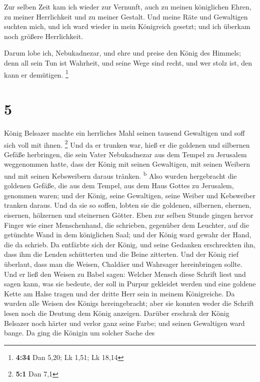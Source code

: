  Zur selben Zeit kam ich wieder zur Vernunft, auch zu
meinen königlichen Ehren, zu meiner Herrlichkeit und zu meiner Gestalt.
Und meine Räte und Gewaltigen suchten mich, und ich ward wieder in mein
Königreich gesetzt; und ich überkam noch größere Herrlichkeit.

 Darum lobe ich, Nebukadnezar, und ehre und preise den
König des Himmels; denn all sein Tun ist Wahrheit, und seine Wege sind
recht, und wer stolz ist, den kann er demütigen. \footnote{\textbf{4:34}
  Dan 5,20; Lk 1,51; Lk 18,14}

\hypertarget{section-4}{%
\section{5}\label{section-4}}

 König Belsazer machte ein herrliches Mahl seinen tausend
Gewaltigen und soff sich voll mit ihnen. \footnote{\textbf{5:1} Dan 7,1}
 Und da er trunken war, hieß er die goldenen und silbernen
Gefäße herbringen, die sein Vater Nebukadnezar aus dem Tempel zu
Jerusalem weggenommen hatte, dass der König mit seinen Gewaltigen, mit
seinen Weibern und mit seinen Kebsweibern daraus tränken.
\textsuperscript{b}  Also wurden hergebracht die goldenen
Gefäße, die aus dem Tempel, aus dem Haus Gottes zu Jerusalem, genommen
waren; und der König, seine Gewaltigen, seine Weiber und Kebsweiber
tranken daraus.  Und da sie so soffen, lobten sie die
goldenen, silbernen, ehernen, eisernen, hölzernen und steinernen Götter.
 Eben zur selben Stunde gingen hervor Finger wie einer
Menschenhand, die schrieben, gegenüber dem Leuchter, auf die getünchte
Wand in dem königlichen Saal; und der König ward gewahr der Hand, die da
schrieb.  Da entfärbte sich der König, und seine Gedanken
erschreckten ihn, dass ihm die Lenden schütterten und die Beine
zitterten.  Und der König rief überlaut, dass man die
Weisen, Chaldäer und Wahrsager hereinbringen sollte. Und er ließ den
Weisen zu Babel sagen: Welcher Mensch diese Schrift liest und sagen
kann, was sie bedeute, der soll in Purpur gekleidet werden und eine
goldene Kette am Halse tragen und der dritte Herr sein in meinem
Königreiche.  Da wurden alle Weisen des Königs
hereingebracht; aber sie konnten weder die Schrift lesen noch die
Deutung dem König anzeigen.  Darüber erschrak der König
Belsazer noch härter und verlor ganz seine Farbe; und seinen Gewaltigen
ward bange.  Da ging die Königin um solcher Sache des
